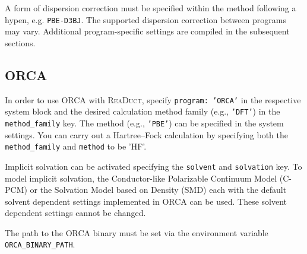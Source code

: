 \documentclass[]{tufte-book}
\begin{document}
A form of dispersion correction must be specified within the method following a hypen, e.g. \texttt{PBE-D3BJ}. The supported dispersion correction between programs may vary. Additional program-specific settings are compiled in the subsequent sections.

\subsection{\textsc{ORCA}}

In order to use \textsc{ORCA} with \textsc{ReaDuct}, specify \texttt{program: 'ORCA'} in the respective system block and the desired
calculation method family (e.g., \texttt{'DFT'}) in the \texttt{method\_family} key.
The method (e.g., \texttt{'PBE'}) can be specified in the system settings.
You can carry out a Hartree--Fock calculation by specifying both the \texttt{method\_family} and \texttt{method} to be 'HF'.

Implicit solvation can be activated specifying the \texttt{solvent} and \texttt{solvation} key.
To model implicit solvation, the Conductor-like Polarizable Continuum Model\cite{cpcm} (C-PCM) or the Solvation Model based on Density\cite{smd} (SMD) each with the default solvent dependent settings implemented in \textsc{ORCA} can be used.
These solvent dependent settings cannot be changed.

The path to the \textsc{ORCA} binary must be set via the environment variable \texttt{ORCA\_BINARY\_PATH}.
\end{document}
